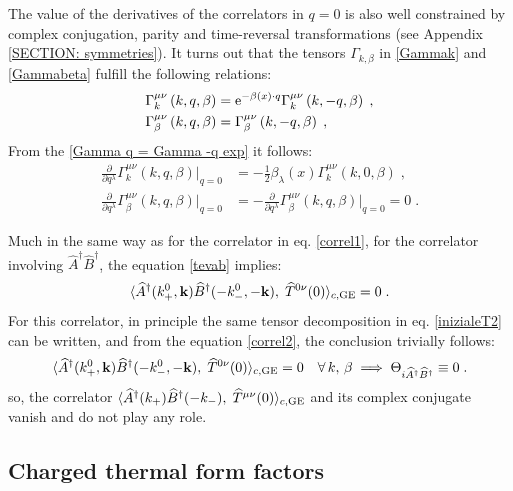 \documentclass[prd,superscriptaddress,nofootinbib,notitlepage]{revtex4-1}
\def\wT{{\widehat T}}
\def\wAd{\widehat A^{\dagger}}
\def\wBd{\widehat B^{\dagger}}
\newcommand{\e}{{\rm e}}
\newcommand{\kb}{{\mathbf{k}}}
\newcommand{\be}{\begin{equation}}
\newcommand{\ee}{\end{equation}}
\begin{document}
The value of the derivatives of the correlators in $q=0$ is also well constrained by complex conjugation, parity and 
time-reversal transformations (see Appendix \ref{SECTION: symmetries}). It turns out that the tensors $\Gamma_{k,\beta}$
in \eqref{Gammak} and \eqref{Gammabeta} fulfill the following relations:
%
\begin{subequations}\label{Gamma q = Gamma -q exp}
    \begin{align}
        \Gamma^{\mu\nu}_k\left(k,q,\beta\right)&=\e^{-\beta(x)\cdot q}\Gamma^{\mu\nu}_k\left(k,-q,\beta\right)\;,\\
        \Gamma^{\mu\nu}_\beta\left(k,q,\beta\right)&=\Gamma^{\mu\nu}_\beta\left(k,-q,\beta\right)\;,
    \end{align}
\end{subequations}
%
From the \eqref{Gamma q = Gamma -q exp} it follows:
%
\begin{subequations}\label{qderiv Gamma}
    \begin{align}
        \frac{\partial}{\partial q^\lambda}\Gamma^{\mu\nu}_k\left(k,q,\beta\right)\Big|_{q=0}&=-\frac{1}{2}\beta_\lambda(x)\Gamma^{\mu\nu}_k\left(k,0,\beta\right)\;,\\
         \frac{\partial}{\partial q^\lambda}\Gamma^{\mu\nu}_\beta\left(k,q,\beta\right)\Big|_{q=0}&=- \frac{\partial}{\partial q^\lambda}\Gamma^{\mu\nu}_\beta\left(k,q,\beta\right)\Big|_{q=0}=0\;.
    \end{align}
\end{subequations}
%

Much in the same way as for the correlator in eq. \eqref{correl1}, for the correlator involving $\wAd\wBd$, the 
equation \eqref{tevab} implies:
%
\be\label{correl2}
\langle\wAd(k^0_+,\kb)\wBd(-k_-^0,-\kb),\;\wT^{0\nu}(0)\rangle_{c,{\rm GE}} = 0\;.
\ee
%
For this correlator, in principle the same tensor decomposition in eq. \eqref{inizialeT2} can be written,
and from the equation \eqref{correl2}, the conclusion trivially follows:
%
$$
 \langle\wAd(k^0_+,\kb)\wBd(-k_-^0,-\kb),\;\wT^{0\nu}(0)\rangle_{c,{\rm GE}} = 0
\quad \forall\, k,\,\beta \implies \Theta_{i\wAd\wBd} \equiv 0\;.
$$
%
so, the correlator $\langle\wAd(k_+)\wBd(-k_-),\;\wT^{\mu\nu}(0)\rangle_{c,{\rm GE}}$ and its complex conjugate vanish and do not 
play any role.

\subsection{Charged thermal form factors}
\end{document}
